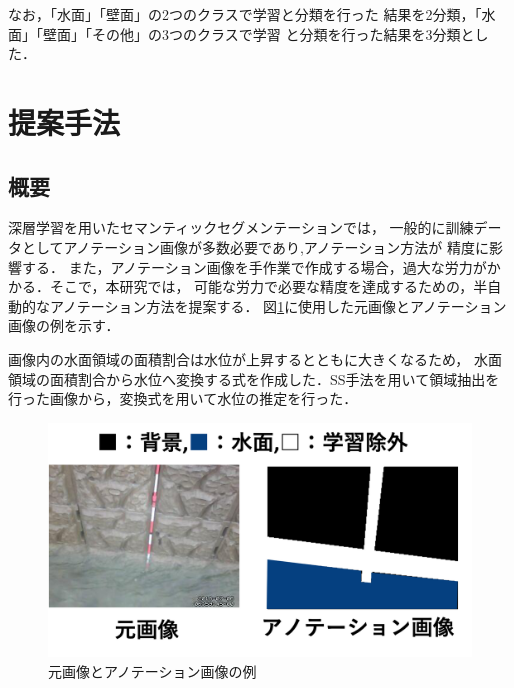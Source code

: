 なお，「水面」「壁面」の2つのクラスで学習と分類を行った
結果を2分類，「水面」「壁面」「その他」の3つのクラスで学習
と分類を行った結果を3分類とした．
\clearpage

\section{提案手法}
\subsection{概要}
\label{4.1}
深層学習を用いたセマンティックセグメンテーションでは，
一般的に訓練データとしてアノテーション画像が多数必要であり,アノテーション方法が
精度に影響する．
また，アノテーション画像を手作業で作成する場合，過大な労力がかかる．そこで，本研究では，
可能な労力で必要な精度を達成するための，半自動的なアノテーション方法を提案する．
図\ref{images}に使用した元画像とアノテーション画像の例を示す．

画像内の水面領域の面積割合は水位が上昇するとともに大きくなるため，
水面領域の面積割合から水位へ変換する式を作成した．SS手法を用いて領域抽出を
行った画像から，変換式を用いて水位の推定を行った．

\vspace{10mm}

\begin{figure}[ht] 
  \begin{center}
    \includegraphics[width=\linewidth]{image/images.png}
  \end{center}
  \vspace{-3mm}
  \caption{元画像とアノテーション画像の例}
  \label{images}
\end{figure}
\clearpage

